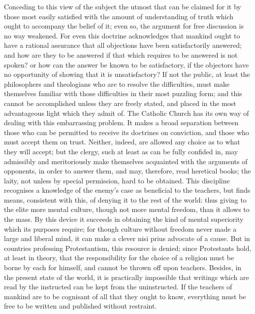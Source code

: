 \documentclass[11pt,openany]{book}
\begin{document}
Conceding to this view of the subject the utmost that can be claimed for it by those most easily satisfied with the amount of understanding of truth which ought to accompany the belief of it; even so, the argument for free discussion is no way weakened. For even this doctrine acknowledges that mankind ought to have a rational assurance that all objections have been satisfactorily answered; and how are they to be answered if that which requires to be answered is not spoken? or how can the answer be known to be satisfactory, if the objectors have no opportunity of showing that it is unsatisfactory? If not the public, at least the philosophers and theologians who are to resolve the difficulties, must make themselves familiar with those difficulties in their most puzzling form; and this cannot be accomplished unless they are freely stated, and placed in the most advantageous light which they admit of. The Catholic Church has its own way of dealing with this embarrassing problem. It makes a broad separation between those who can be permitted to receive its doctrines on conviction, and those who must accept them on trust. Neither, indeed, are allowed any choice as to what they will accept; but the clergy, such at least as can be fully confided in, may admissibly and meritoriously make themselves acquainted with the arguments of opponents, in order to answer them, and may, therefore, read heretical books; the laity, not unless by special permission, hard to be obtained. This discipline recognises a knowledge of the enemy's case as beneficial to the teachers, but finds means, consistent with this, of denying it to the rest of the world: thus giving to the elite more mental culture, though not more mental freedom, than it allows to the mass. By this device it succeeds in obtaining the kind of mental superiority which its purposes require; for though culture without freedom never made a large and liberal mind, it can make a clever nisi prius advocate of a cause. But in countries professing Protestantism, this resource is denied; since Protestants hold, at least in theory, that the responsibility for the choice of a religion must be borne by each for himself, and cannot be thrown off upon teachers. Besides, in the present state of the world, it is practically impossible that writings which are read by the instructed can be kept from the uninstructed. If the teachers of mankind are to be cognisant of all that they ought to know, everything must be free to be written and published without restraint.
\end{document}
